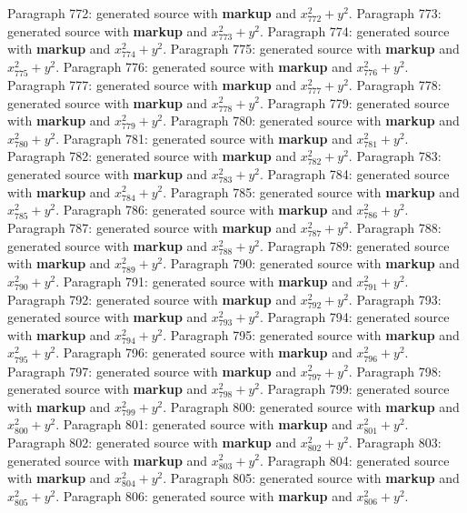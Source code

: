 \documentclass{article}
\begin{document}
Paragraph 772: generated source with \textbf{markup} and $x_{772}^2 + y^2$.
Paragraph 773: generated source with \textbf{markup} and $x_{773}^2 + y^2$.
Paragraph 774: generated source with \textbf{markup} and $x_{774}^2 + y^2$.
Paragraph 775: generated source with \textbf{markup} and $x_{775}^2 + y^2$.
Paragraph 776: generated source with \textbf{markup} and $x_{776}^2 + y^2$.
Paragraph 777: generated source with \textbf{markup} and $x_{777}^2 + y^2$.
Paragraph 778: generated source with \textbf{markup} and $x_{778}^2 + y^2$.
Paragraph 779: generated source with \textbf{markup} and $x_{779}^2 + y^2$.
Paragraph 780: generated source with \textbf{markup} and $x_{780}^2 + y^2$.
Paragraph 781: generated source with \textbf{markup} and $x_{781}^2 + y^2$.
Paragraph 782: generated source with \textbf{markup} and $x_{782}^2 + y^2$.
Paragraph 783: generated source with \textbf{markup} and $x_{783}^2 + y^2$.
Paragraph 784: generated source with \textbf{markup} and $x_{784}^2 + y^2$.
Paragraph 785: generated source with \textbf{markup} and $x_{785}^2 + y^2$.
Paragraph 786: generated source with \textbf{markup} and $x_{786}^2 + y^2$.
Paragraph 787: generated source with \textbf{markup} and $x_{787}^2 + y^2$.
Paragraph 788: generated source with \textbf{markup} and $x_{788}^2 + y^2$.
Paragraph 789: generated source with \textbf{markup} and $x_{789}^2 + y^2$.
Paragraph 790: generated source with \textbf{markup} and $x_{790}^2 + y^2$.
Paragraph 791: generated source with \textbf{markup} and $x_{791}^2 + y^2$.
Paragraph 792: generated source with \textbf{markup} and $x_{792}^2 + y^2$.
Paragraph 793: generated source with \textbf{markup} and $x_{793}^2 + y^2$.
Paragraph 794: generated source with \textbf{markup} and $x_{794}^2 + y^2$.
Paragraph 795: generated source with \textbf{markup} and $x_{795}^2 + y^2$.
Paragraph 796: generated source with \textbf{markup} and $x_{796}^2 + y^2$.
Paragraph 797: generated source with \textbf{markup} and $x_{797}^2 + y^2$.
Paragraph 798: generated source with \textbf{markup} and $x_{798}^2 + y^2$.
Paragraph 799: generated source with \textbf{markup} and $x_{799}^2 + y^2$.
Paragraph 800: generated source with \textbf{markup} and $x_{800}^2 + y^2$.
Paragraph 801: generated source with \textbf{markup} and $x_{801}^2 + y^2$.
Paragraph 802: generated source with \textbf{markup} and $x_{802}^2 + y^2$.
Paragraph 803: generated source with \textbf{markup} and $x_{803}^2 + y^2$.
Paragraph 804: generated source with \textbf{markup} and $x_{804}^2 + y^2$.
Paragraph 805: generated source with \textbf{markup} and $x_{805}^2 + y^2$.
Paragraph 806: generated source with \textbf{markup} and $x_{806}^2 + y^2$.
\end{document}
